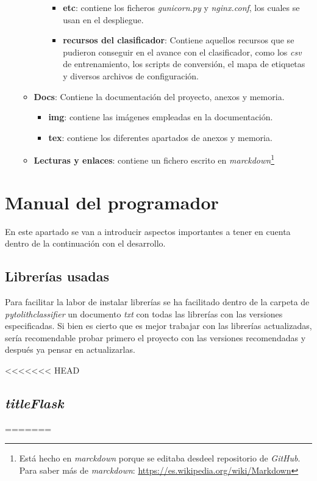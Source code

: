 \begin{itemize}
\begin{itemize}
\begin{itemize}
\begin{itemize}
					\item \textbf{etc}: contiene los ficheros \textit{gunicorn.py} y \textit{nginx.conf}, los cuales se usan en el despliegue.
					\item \textbf{recursos del clasificador}: Contiene aquellos recursos que se pudieron conseguir en el avance con el clasificador, como los \textit{csv} de entrenamiento, los scripts de conversión, el mapa de etiquetas y diversos archivos de configuración.
				\end{itemize}
			\end{itemize}
		\item \textbf{Docs}: Contiene la documentación del proyecto, anexos y memoria.
		\begin{itemize}
			\item \textbf{img}: contiene las imágenes empleadas en la documentación.
			\item \textbf{tex}: contiene los diferentes apartados de anexos y memoria.
		\end{itemize}
		\item \textbf{Lecturas y enlaces}: contiene un fichero escrito en \textit{marckdown}\footnote{Está hecho en \textit{marckdown} porque se editaba desdeel repositorio de \textit{GitHub}. Para saber más de \textit{marckdown}: \url{https://es.wikipedia.org/wiki/Markdown}}
	\end{itemize}
\end{itemize}
\section{Manual del programador}
En este apartado se van a introducir aspectos importantes a tener en cuenta dentro de la continuación con el desarrollo.

\subsection{Librerías usadas}
Para facilitar la labor de instalar librerías se ha facilitado dentro de la carpeta de \textit{pytolithclassifier} un documento \textit{txt} con todas las librerías con las versiones especificadas. Si bien es cierto que es mejor trabajar con las librerías actualizadas, sería recomendable probar primero el proyecto con las versiones recomendadas y después ya pensar en actualizarlas.

<<<<<<< HEAD
\subsection{\textit{titleFlask}}
=======
